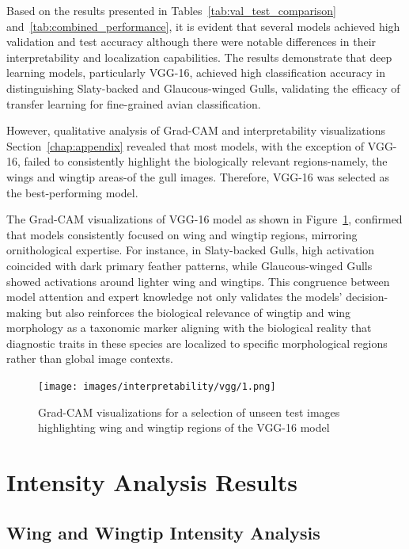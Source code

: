 \documentclass[a4paper,12pt]{report}
\begin{document}
Based on the results presented in Tables~\ref{tab:val_test_comparison} and~\ref{tab:combined_performance}, it is evident that several models achieved high validation and test accuracy although there were notable differences in their interpretability and localization capabilities. The results demonstrate that deep learning models, particularly VGG-16, achieved high classification accuracy in distinguishing Slaty-backed and Glaucous-winged Gulls, validating the efficacy of transfer learning for fine-grained avian classification.

However, qualitative analysis of Grad-CAM and interpretability visualizations Section~\ref{chap:appendix} revealed that most models, with the exception of VGG-16, failed to consistently highlight the biologically relevant regions-namely, the wings and wingtip areas-of the gull images. Therefore, VGG-16 was selected as the best-performing model.

The Grad-CAM visualizations of VGG-16 model as shown in Figure~\ref{fig:vgg16_gradcam}, confirmed that models consistently focused on wing and wingtip regions, mirroring ornithological expertise. For instance, in Slaty-backed Gulls, high activation coincided with dark primary feather patterns, while Glaucous-winged Gulls showed activations around lighter wing and wingtips. This congruence between model attention and expert knowledge not only validates the models’ decision-making but also reinforces the biological relevance of wingtip and wing morphology as a taxonomic marker aligning with the biological reality that diagnostic traits in these species are localized to specific morphological regions rather than global image contexts.

\begin{figure}[H]
    \centering
    \texttt{[image: images/interpretability/vgg/1.png]}
    \caption{Grad-CAM visualizations for a selection of unseen test images highlighting wing and wingtip regions of the VGG-16 model}
    \label{fig:vgg16_gradcam}
\end{figure}

\section{Intensity Analysis Results}

\subsection{Wing and Wingtip Intensity Analysis}
\end{document}
